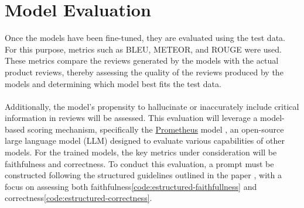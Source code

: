 \section{Model Evaluation}\label{subsec:model-evaluation}
Once the models have been fine-tuned, they are evaluated using the test data. For this purpose, metrics such as BLEU, METEOR, and ROUGE were used. These metrics compare the reviews generated by the models with the actual product reviews, thereby assessing the quality of the reviews produced by the models and determining which model best fits the test data.
\\\\
Additionally, the model's propensity to hallucinate or inaccurately include critical information in reviews will be assessed. This evaluation will leverage a model-based scoring mechanism, specifically the \href{https://huggingface.co/prometheus-eval/prometheus-7b-v2.0}{Prometheus} model \cite{kim2024prometheus2opensource}, an open-source large language model (LLM) designed to evaluate various capabilities of other models. For the trained models, the key metrics under consideration will be faithfulness and correctness. To conduct this evaluation, a prompt must be constructed following the structured guidelines outlined in the paper \cite{kim2024prometheus2opensource}, with a focus on assessing both faithfulness\ref{code:estructured-faithfullness} and correctness\ref{code:estructured-correctness}.

